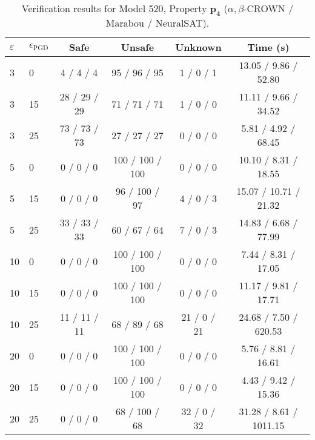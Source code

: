 \begin{table}[htbp]\centering
\caption{\small Verification results for Model 520, Property $\mathbf{p_{4}}$ ($\alpha,\beta$-CROWN / Marabou / NeuralSAT).}
\label{tab:model520_p4}
\begin{tabular}{llcccc}
\toprule
$\varepsilon$ & $\epsilon_{\scriptscriptstyle\mathrm{PGD}}$ & Safe & Unsafe & Unknown & Time (s) \\
\midrule
3 & 0 & 4 / 4 / 4 & 95 / 96 / 95 & 1 / 0 / 1 & 13.05 / 9.86 / 52.80 \\
3 & 15 & 28 / 29 / 29 & 71 / 71 / 71 & 1 / 0 / 0 & 11.11 / 9.66 / 34.52 \\
3 & 25 & 73 / 73 / 73 & 27 / 27 / 27 & 0 / 0 / 0 & 5.81 / 4.92 / 68.45 \\
5 & 0 & 0 / 0 / 0 & 100 / 100 / 100 & 0 / 0 / 0 & 10.10 / 8.31 / 18.55 \\
5 & 15 & 0 / 0 / 0 & 96 / 100 / 97 & 4 / 0 / 3 & 15.07 / 10.71 / 21.32 \\
5 & 25 & 33 / 33 / 33 & 60 / 67 / 64 & 7 / 0 / 3 & 14.83 / 6.68 / 77.99 \\
10 & 0 & 0 / 0 / 0 & 100 / 100 / 100 & 0 / 0 / 0 & 7.44 / 8.31 / 17.05 \\
10 & 15 & 0 / 0 / 0 & 100 / 100 / 100 & 0 / 0 / 0 & 11.17 / 9.81 / 17.71 \\
10 & 25 & 11 / 11 / 11 & 68 / 89 / 68 & 21 / 0 / 21 & 24.68 / 7.50 / 620.53 \\
20 & 0 & 0 / 0 / 0 & 100 / 100 / 100 & 0 / 0 / 0 & 5.76 / 8.81 / 16.61 \\
20 & 15 & 0 / 0 / 0 & 100 / 100 / 100 & 0 / 0 / 0 & 4.43 / 9.42 / 15.36 \\
20 & 25 & 0 / 0 / 0 & 68 / 100 / 68 & 32 / 0 / 32 & 31.28 / 8.61 / 1011.15 \\
\bottomrule
\end{tabular}
\end{table}
